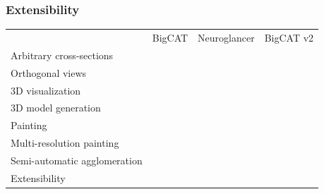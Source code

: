 \documentclass[aspectratio=169,table]{beamer}
\newcommand{\cmark}{\ding{51}}%
\newcommand{\xmark}{\ding{55}}%
\newcommand{\gcmark}{{\color{green}\cmark}}%
\newcommand{\ycmark}{{\color{yellow}\cmark}}%
\newcommand{\rxmark}{{\color{red}\xmark}}%
\begin{document}
\begin{frame}
    \frametitle{Extensibility}
    \small
    \vspace{1cm}
    \begin{table}
        \centering
        \begin{tabular}{lccc}
                                       & BigCAT & Neuroglancer & BigCAT v2 \\
          Arbitrary cross-sections     & \gcmark & \gcmark & \gcmark \\
          Orthogonal views             & \rxmark & \gcmark & \gcmark \\ 
          3D visualization             & \rxmark & \gcmark & \gcmark \\ 
          3D model generation          & \rxmark & \rxmark & \gcmark \\ 
          Painting                     & \gcmark & \rxmark & \gcmark \\ 
          Multi-resolution painting         & \rxmark & \rxmark & \gcmark \\ 
          Semi-automatic agglomeration & \rxmark & \rxmark & \gcmark \\ 
          \rowcolor{black!20}  Extensibility                & \rxmark & \ycmark & \gcmark \\
        \end{tabular}
    \end{table}
\end{frame}
\end{document}
